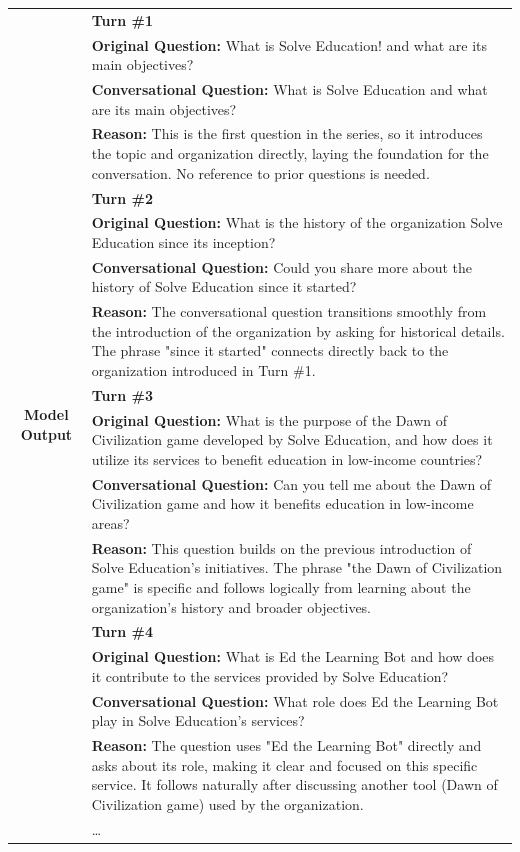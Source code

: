 \documentclass[11pt]{article}
\begin{document}
{\begin{longtable}{c p{12cm}}
\multirow{34}{*}{\textbf{Model Output}} & \textbf{Turn \#1}\\
&\textbf{Original Question:} What is Solve Education! and what are its main objectives?\\
&\textbf{Conversational Question:} What is Solve Education and what are its main objectives?\\
&\textbf{Reason:} This is the first question in the series, so it introduces the topic and organization directly, laying the foundation for the conversation. No reference to prior questions is needed.\\
& \textbf{Turn \#2}\\
&\textbf{Original Question:} What is the history of the organization Solve Education since its inception?\\
&\textbf{Conversational Question:} Could you share more about the history of Solve Education since it started?\\
&\textbf{Reason:} The conversational question transitions smoothly from the introduction of the organization by asking for historical details. The phrase "since it started" connects directly back to the organization introduced in Turn \#1.\\
& \textbf{Turn \#3}\\
&\textbf{Original Question:} What is the purpose of the Dawn of Civilization game developed by Solve Education, and how does it utilize its services to benefit education in low-income countries?\\
&\textbf{Conversational Question:} Can you tell me about the Dawn of Civilization game and how it benefits education in low-income areas?\\
&\textbf{Reason:} This question builds on the previous introduction of Solve Education's initiatives. The phrase "the Dawn of Civilization game" is specific and follows logically from learning about the organization's history and broader objectives.\\
& \textbf{Turn \#4}\\
&\textbf{Original Question:} What is Ed the Learning Bot and how does it contribute to the services provided by Solve Education?\\
&\textbf{Conversational Question:} What role does Ed the Learning Bot play in Solve Education's services?\\
&\textbf{Reason:} The question uses "Ed the Learning Bot" directly and asks about its role, making it clear and focused on this specific service. It follows naturally after discussing another tool (Dawn of Civilization game) used by the organization.\\
&\dots\\
\bottomrule



\end{longtable}}
\end{document}
